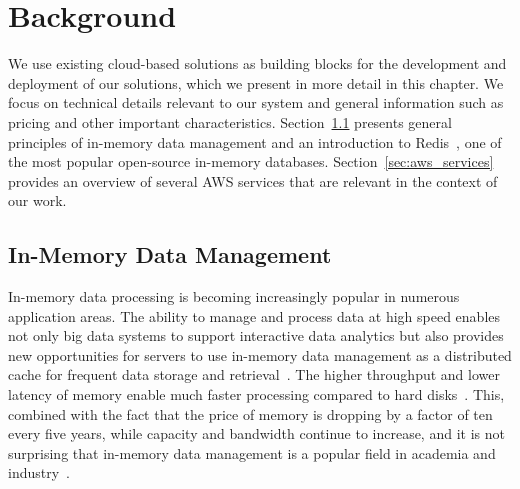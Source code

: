 \chapter{Background}
\label{cha:background}
We use existing cloud-based solutions as building blocks for the development and deployment of our solutions, which we present in more detail in this chapter. We focus on technical details relevant to our system and general information such as pricing and other important characteristics. Section~\ref{sec:in_memory} presents general principles of in-memory data management and an introduction to Redis~\cite{noauthor_redis_nodate-3}, one of the most popular open-source in-memory databases. Section~\ref{sec:aws_services} provides an overview of several AWS services that are relevant in the context of our work.

\section{In-Memory Data Management}
\label{sec:in_memory}
In-memory data processing is becoming increasingly popular in numerous application areas. The ability to manage and process data at high speed enables not only big data systems to support interactive data analytics but also provides new opportunities for servers to use in-memory data management as a distributed cache for frequent data storage and retrieval~\cite{zhang_-memory_2015}. The higher throughput and lower latency of memory enable much faster processing compared to hard disks~\cite{chen_towards_2016}. This, combined with the fact that the price of memory is dropping by a factor of ten every five years, while capacity and bandwidth continue to increase, and it is not surprising that in-memory data management is a popular field in academia and industry~\cite{zhang_-memory_2015}. 

